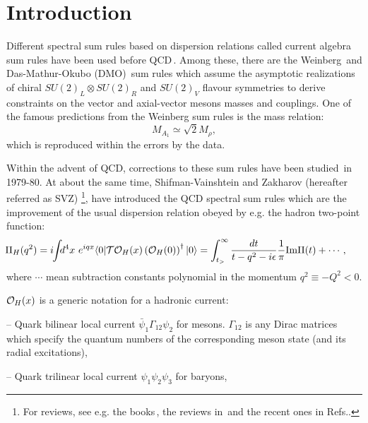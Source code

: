 \documentclass[aps,prd,groupedaddress,nofootinbib]{revtex4-1}
\def\beq{\begin{equation}}
\def\eeq{\end{equation}}
\def\ga{\left(}
\def\dr{\right)}
\def\la{\langle}
\def\ra{\rangle}
\def\nin{\noindent}
\begin{document}
\section{Introduction}
\vspace*{-0.2cm}
Different spectral sum  rules based on dispersion relations called current algebra sum rules have been used before QCD\,\cite{FURLAN}. Among these, there are the Weinberg\,\cite{WEIN} and Das-Mathur-Okubo (DMO)\,\cite{DMO} sum rules which assume the asymptotic realizations of chiral $SU(2)_L\otimes SU(2)_R$ and $SU(2)_V$ flavour symmetries to derive constraints on the vector and axial-vector mesons masses and couplings.  One of the famous predictions from the Weinberg sum rules is the mass relation:
\beq
M_{A_1}\simeq \sqrt{2}M_\rho,
\eeq
which is reproduced within the errors by the data.  

Within the advent of QCD, corrections to these sum rules have been studied\,\cite{FNR,DMOQCD,GMONARISON}  in 1979-80. At about the same time, 
Shifman-Vainshtein and Zakharov (hereafter referred as SVZ)\,\cite{SVZa,ZAKA}\,\footnote{For reviews, see e.g. the books\,\cite{SNB1,SNB2}, the reviews in\,\cite{SNB3,RRY,BERTa,REV} and the recent ones in Refs.\cite{SNREV22,SNREV21,SNbc15}.}, have introduced the QCD spectral sum rules %
which are the improvement of the usual dispersion relation obeyed by e.g. the hadron two-point function:
 \beq
\hspace*{-0.6cm} \Pi_H(q^2)=i\hspace*{-0.1cm}\int \hspace*{-0.15cm}d^4x ~e^{iqx}\la 0\vert {\cal T} {\cal O}_H(x)\ga {\cal O}_H(0)\dr^\dagger \vert 0\ra=\int_{t_>}^\infty \frac{dt}{t-q^2-i\epsilon}\frac{1}{\pi}{\rm Im}\Pi(t)+\cdots,
 \label{eq:2-point}
 \eeq
where $\cdots$ mean subtraction constants polynomial in the momentum $q^2\equiv -Q^2<0$. 

${\cal O}_H(x)$ is a generic notation for a hadronic current:

-- Quark bilinear local current $\bar \psi_1\Gamma_{12}\psi_2$ for mesons. 
$\Gamma_{12}$ is any Dirac matrices which specify the quantum numbers of the corresponding meson state (and its radial excitations),

-- Quark trilinear local current $\psi_1\psi_2\psi_3$ for baryons,
\end{document}
